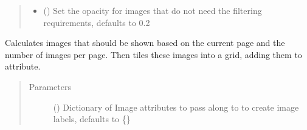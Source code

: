 \documentclass[letterpaper,10pt,english]{sphinxmanual}
\begin{document}
\begin{fulllineitems}
\begin{fulllineitems}
\begin{quote}
\begin{description}
\begin{itemize}
\item {} 
 (\sphinxstyleliteralemphasis{\sphinxupquote{, }}) \textendash{} Set the opacity for images that do not need the
filtering requirements, defaults to 0.2

\end{itemize}

\end{description}\end{quote}

\end{fulllineitems}


\begin{fulllineitems}
\label{\detokenize{polo.widgets:polo.widgets.plate_viewer.plateViewer.subgrid_dict}}
\end{fulllineitems}


\begin{fulllineitems}
\label{\detokenize{polo.widgets:polo.widgets.plate_viewer.plateViewer.tile_images_onto_scene}}
Calculates images that should be shown based on the current page
and the number of images per page. Then tiles these images into a grid,
adding them to  attribute.
\begin{quote}\begin{description}
\item[{Parameters}] \leavevmode
{} (\sphinxstyleliteralemphasis{\sphinxupquote{, }}) \textendash{} Dictionary of Image attributes to pass along to
{\hyperref[\detokenize{polo.widgets:polo.widgets.plate_viewer.plateViewer._make_image_label}]{}}
to create image labels, defaults to \{\}


\end{description}
\end{quote}
\end{fulllineitems}
\end{fulllineitems}
\end{document}
